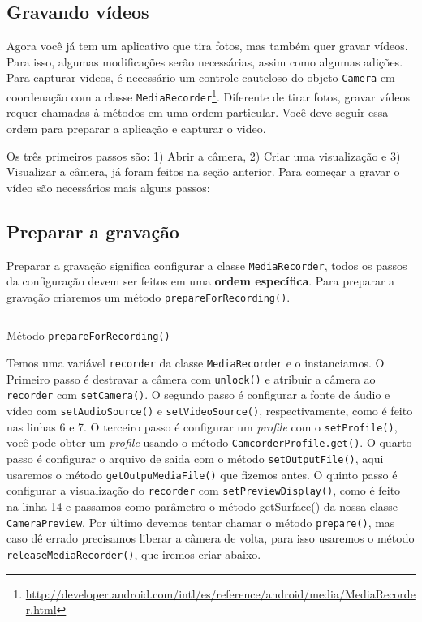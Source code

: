 \documentclass[a4paper,12pt,brazil]{book}
\begin{document}
\begin{singlespace}
	\section{Gravando vídeos}

		Agora você já tem um aplicativo que tira fotos, mas também quer gravar vídeos. Para isso, algumas modificações serão necessárias, assim como algumas adições. Para capturar videos, é necessário um controle cauteloso do objeto \texttt{Camera} em coordenação com a classe \texttt{MediaRecorder}\footnote{\href{http://developer.android.com/intl/es/reference/android/media/MediaRecorder.html}{http://developer.android.com/intl/es/reference/android/media/MediaRecorder.html}}. Diferente de tirar fotos, gravar vídeos requer chamadas à métodos em uma ordem particular. Você deve seguir essa ordem para preparar a aplicação e capturar o video. 

		Os três primeiros passos são: 1) Abrir a câmera, 2) Criar uma visualização e 3) Visualizar a câmera, já foram feitos na seção anterior. Para começar a gravar o vídeo são necessários mais alguns passos:

	\subsection{Preparar a gravação}

		Preparar a gravação significa configurar a classe \texttt{MediaRecorder}, todos os passos da configuração devem ser feitos em uma \textbf{ordem específica}. Para preparar a gravação criaremos um método \texttt{prepareForRecording()}.

		\begin{listing}[H]
		\inputminted[linenos=true,fontsize=\small,frame=lines, framesep=2mm, tabsize=2,numbersep=5pt]{java}{src/api/camera/prepareVideo.java}
		\caption{Método \texttt{prepareForRecording()}}
		\label{code:preparevideo}
		\end{listing} 			

		Temos uma variável \texttt{recorder} da classe \texttt{MediaRecorder} e o instanciamos. O Primeiro passo é destravar a câmera com \texttt{unlock()} e atribuir a câmera ao \texttt{recorder} com \texttt{setCamera()}. O segundo passo é configurar a fonte de áudio e vídeo com \texttt{setAudioSource()} e \texttt{setVideoSource()}, respectivamente, como é feito nas linhas 6 e 7. O terceiro passo é configurar um \emph{profile} com o \texttt{setProfile()}, você pode obter um \emph{profile} usando o método \texttt{CamcorderProfile.get()}. O quarto passo é configurar o arquivo de saida com o método \texttt{setOutputFile()}, aqui usaremos o método \texttt{getOutpuMediaFile()} que fizemos antes. O quinto passo é configurar a visualização do \texttt{recorder} com \texttt{setPreviewDisplay()}, como é feito na linha 14 e passamos como parâmetro o método getSurface() da nossa classe \texttt{CameraPreview}. Por último devemos tentar chamar o método \texttt{prepare()}, mas caso dê errado precisamos liberar a câmera de volta, para isso usaremos o método \texttt{releaseMediaRecorder()}, que iremos criar abaixo.


\end{singlespace}
\end{document}
